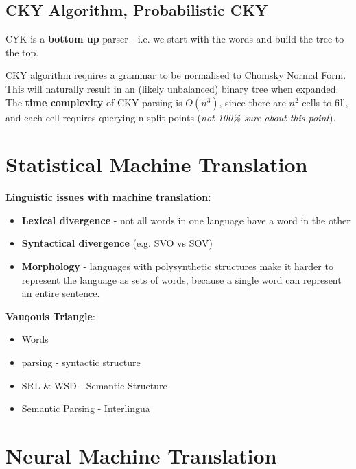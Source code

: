 \documentclass[]{article}
\begin{document}
	
	\subsection{CKY Algorithm, Probabilistic CKY}
	
	CYK is a \textbf{bottom up} parser - i.e. we start with the words and build the tree to the top. 
	
	CKY algorithm requires a grammar to be normalised to Chomsky Normal Form. This will naturally result in an (likely unbalanced) binary tree when expanded. \\
	
	The \textbf{time complexity} of CKY parsing is $O(n^3)$, since there are $n^2$ cells to fill, and each cell requires querying n split points (\textit{not 100\% sure about this point}). 
	
    \clearpage
	\section{Statistical Machine Translation}
	
	\textbf{Linguistic issues with machine translation:}
	
	\begin{itemize}
	 \item \textbf{Lexical divergence} - not all words in one language have a word in the other
	 \item \textbf{Syntactical divergence} (e.g. SVO vs SOV)
	 \item \textbf{Morphology} - languages with polysynthetic structures make it harder to represent the language as sets of words, because a single word can represent an entire sentence.   
	\end{itemize}
	
	
	
	\textbf{Vauqouis Triangle}:
	
	\begin{itemize}
		\item Words 
		\item parsing -  syntactic structure
		\item SRL \& WSD - Semantic Structure
		\item Semantic Parsing -  Interlingua
	\end{itemize}
	
	\clearpage
	\section{Neural Machine Translation}
	
\end{document}
